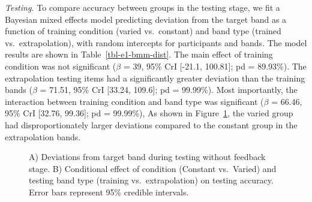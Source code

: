 \documentclass[
  12pt,
  letterpaper,
]{article}
\begin{document}
\emph{Testing.} To compare accuracy between groups in the testing stage,
we fit a Bayesian mixed effects model predicting deviation from the
target band as a function of training condition (varied vs.~constant)
and band type (trained vs.~extrapolation), with random intercepts for
participants and bands. The model results are shown in
Table~\ref{tbl-e1-bmm-dist}. The main effect of training condition was
not significant (\(\beta\) = 39, 95\% CrI {[}-21.1, 100.81{]}; pd =
89.93\%). The extrapolation testing items had a significantly greater
deviation than the training bands (\(\beta\) = 71.51, 95\% CrI {[}33.24,
109.6{]}; pd = 99.99\%). Most importantly, the interaction between
training condition and band type was significant (\(\beta\) = 66.46,
95\% CrI {[}32.76, 99.36{]}; pd = 99.99\%), As shown in
Figure~\ref{fig-e1-test-dev}, the varied group had disproportionately
larger deviations compared to the constant group in the extrapolation
bands.

\begin{figure}


\caption{\label{fig-e1-test-dev}A) Deviations from target band during
testing without feedback stage. B) Conditional effect of condition
(Constant vs.~Varied) and testing band type (training vs.~extrapolation)
on testing accuracy. Error bars represent 95\% credible intervals.}

\end{figure}%

\hfill\break
\end{document}
